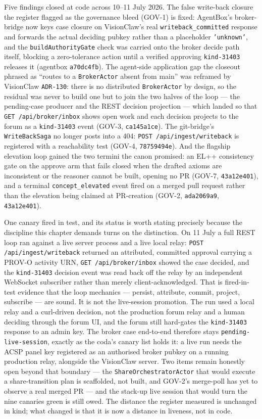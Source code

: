 Five findings closed at code across 10--11 July 2026. The false write-back closure the register flagged as the governance bleed (GOV-1) is fixed: AgentBox's broker-bridge now keys case closure on VisionClaw's real \texttt{writeback\_committed} response and forwards the actual deciding pubkey rather than a placeholder \texttt{'unknown'}, and the \texttt{buildAuthorityGate} check was carried onto the broker decide path itself, blocking a zero-tolerance action until a verified approving \texttt{kind-31403} releases it (agentbox \texttt{a70dc4fb}). The agent-side application gap the closeout phrased as ``routes to a \texttt{BrokerActor} absent from main'' was reframed by VisionClaw \texttt{ADR-130}: there is no distributed \texttt{BrokerActor} by design, so the residual was never to build one but to join the two halves of the loop --- the pending-case producer and the REST decision projection --- which landed so that \texttt{GET /api/broker/inbox} shows open work and each decision projects to the forum as a \texttt{kind-31403} event (GOV-3, \texttt{ca145a1ce}). The git-bridge's \texttt{WriteBackSaga} no longer posts into a 404: \texttt{POST /api/ingest/writeback} is registered with a reachability test (GOV-4, \texttt{78759494e}). And the flagship elevation loop gained the two termini the canon promised: an EL++ consistency gate on the approve arm that fails closed when the drafted axioms are inconsistent or the reasoner cannot be built, opening no PR (GOV-7, \texttt{43a12e401}), and a terminal \texttt{concept\_elevated} event fired on a merged pull request rather than the elevation being claimed at PR-creation (GOV-2, \texttt{ada2069a9}, \texttt{43a12e401}).

One canary fired in test, and its status is worth stating precisely because the discipline this chapter demands turns on the distinction. On 11 July a full REST loop ran against a live server process and a live local relay: \texttt{POST /api/ingest/writeback} returned an attributed, committed approval carrying a PROV-O activity URN, \texttt{GET /api/broker/inbox} showed the case decided, and the \texttt{kind-31403} decision event was read back off the relay by an independent WebSocket subscriber rather than merely client-acknowledged. That is fired-in-test evidence that the loop mechanics --- persist, attribute, commit, project, subscribe --- are sound. It is not the live-session promotion. The run used a local relay and a curl-driven decision, not the production forum relay and a human deciding through the forum UI, and the forum still hard-gates the \texttt{kind-31403} response to an admin key. The broker case end-to-end therefore stays \texttt{pending-live-session}, exactly as the coda's canary list holds it: a live run needs the ACSP panel key registered as an authorised broker pubkey on a running production relay, alongside the VisionClaw server. Two items remain honestly open beyond that boundary --- the \texttt{ShareOrchestratorActor} that would execute a share-transition plan is scaffolded, not built, and GOV-2's merge-poll has yet to observe a real merged PR --- and the stack-up live session that would turn the nine canaries green is still owed. The distance the register measured is unchanged in kind; what changed is that it is now a distance in liveness, not in code.

